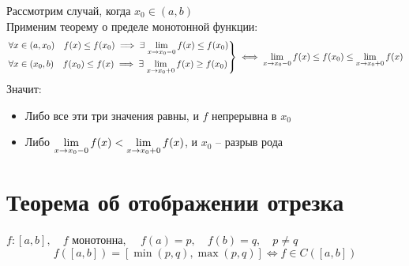 \begin{replacementproof}
	Рассмотрим случай, когда $x_0 \in (a, b)$ \\
	Применим теорему о пределе монотонной функции:
	$$ \begin{rcases}
		\forall x \in (a, x_0) \quad f(x) \le f(x_0) \implies \exists\, \lim\limits_{x \to x_0 - 0} f(x) \le f(x_0) \\
		\forall x \in (x_0, b) \quad f(x_0) \le f(x) \implies \exists\, \lim\limits_{x \to x_0+0} f(x) \ge f(x_0)
	\end{rcases} \iff \lim\limits_{x \to x_0 - 0} f(x) \le f(x_0) \le \lim\limits_{x \to x_0+0} f(x) $$
	Значит:
	\begin{itemize}
		\item Либо все эти три значения равны, и $f$ непрерывна в $x_0$
		\item Либо $\lim\limits_{x \to x_0-0} f(x) < \lim\limits_{x \to x_0 + 0} f(x)$, и $x_0$ -- разрыв  рода
	\end{itemize}
\end{replacementproof}

\section{Теорема об отображении отрезка}

\begin{theorem}
	$f : [a, b], \quad f$ монотонна, $\quad f(a) = p, \quad f(b) = q, \quad p \ne q $
	$$ f([a,b]) = [\min(p, q), \max(p, q)] \iff f \in C([a,b]) $$
\end{theorem}

